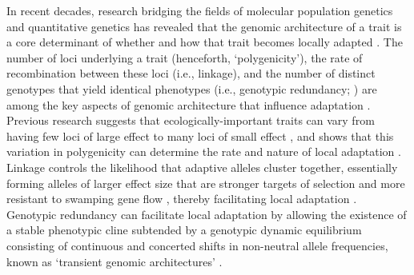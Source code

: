 \documentclass[9pt,twocolumn,twoside,lineno]{pnas-new}
\begin{document}
In recent decades, research bridging the fields
of molecular population genetics
and quantitative genetics
\cite{barghi_polygenic,barton,pritchard_human_adaptation,pritchard_sweeps_alone}
has revealed that the genomic architecture of a trait
is a core determinant of whether and how that trait
becomes locally adapted \cite{yeaman_review}.
The number of loci underlying a trait (henceforth, `polygenicity'),
the rate of recombination between these loci (i.e., linkage),
and the number of distinct genotypes that yield identical phenotypes
(i.e., genotypic redundancy; \cite{yeaman_review,laruson,barghi_polygenic})
are among the key aspects of genomic architecture that influence adaptation
\cite{barton,yeaman_whitlock,yeaman_review,lecorre}.
Previous research suggests that ecologically-important traits can vary from having
few loci of large effect \cite{martin,rees}
to many loci of small effect \cite{boyle,rockman,savolainen,sella,barghi_polygenic},
and shows that this variation in polygenicity can
determine the rate and nature of local adaptation \cite{yeaman_amnat}. 
Linkage controls the likelihood that adaptive alleles cluster together,
essentially forming alleles of larger effect size that are stronger 
targets of selection and more resistant
to swamping gene flow \cite{yeaman_whitlock},
thereby facilitating local adaptation \cite{tigano}.
Genotypic redundancy can facilitate local adaptation 
by allowing the existence of a stable phenotypic cline
subtended by a genotypic dynamic equilibrium
consisting of continuous and concerted shifts in non-neutral allele frequencies, known as `transient 
genomic architectures' \cite{barghi_redundancy,manceau,yeaman_amnat}.
\end{document}
